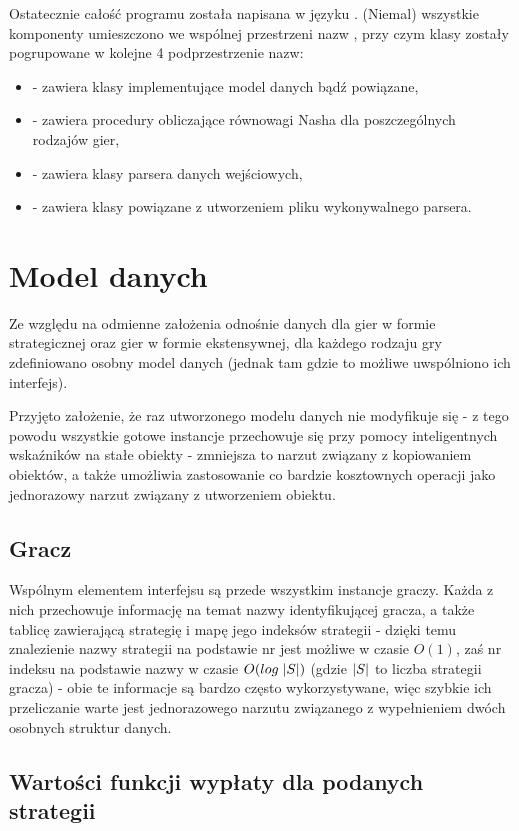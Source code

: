 \documentclass{standalone}
\begin{document}
Ostatecznie całość programu została napisana w języku . (Niemal) wszystkie komponenty umieszczono we
wspólnej przestrzeni nazw , przy czym klasy zostały pogrupowane w kolejne 4 podprzestrzenie nazw:
\begin{itemize}
\item {} - zawiera klasy implementujące model danych bądź powiązane,
\item {} - zawiera procedury obliczające równowagi Nasha dla poszczególnych rodzajów gier,
\item {} - zawiera klasy parsera danych wejściowych,
\item {} - zawiera klasy powiązane z utworzeniem pliku wykonywalnego parsera.
\end{itemize}

\section{Model danych}

Ze względu na odmienne założenia odnośnie danych dla gier w formie strategicznej oraz gier w formie
ekstensywnej, dla każdego rodzaju gry zdefiniowano osobny model danych (jednak tam gdzie to możliwe
uwspólniono ich interfejs).

Przyjęto założenie, że raz utworzonego modelu danych nie modyfikuje się - z tego powodu wszystkie gotowe
instancje przechowuje się przy pomocy inteligentnych wskaźników na stałe obiekty - zmniejsza to narzut
związany z kopiowaniem obiektów, a także umożliwia zastosowanie co bardzie kosztownych operacji jako
jednorazowy narzut związany z utworzeniem obiektu.

\subsection{Gracz}

Wspólnym elementem interfejsu są przede wszystkim instancje graczy. Każda z nich przechowuje informację na
temat nazwy identyfikującej gracza, a także tablicę zawierającą strategię i mapę jego indeksów strategii -
dzięki temu znalezienie nazwy strategii na podstawie nr jest możliwe w czasie $O(1)$, zaś nr indeksu na
podstawie nazwy w czasie $O(log\;|S|)$ (gdzie $|S|$ to liczba strategii gracza) - obie te informacje
są bardzo często wykorzystywane, więc szybkie ich przeliczanie warte jest jednorazowego narzutu związanego
z wypełnieniem dwóch osobnych struktur danych.

\subsection{Wartości funkcji wypłaty dla podanych strategii}
\end{document}
